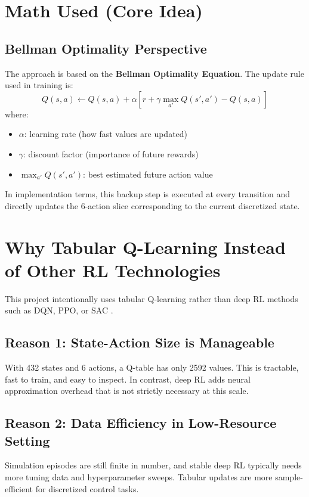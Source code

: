 \documentclass[conference]{IEEEtran}
\begin{document}
\section{Math Used (Core Idea)}
\subsection{Bellman Optimality Perspective}
The approach is based on the \textbf{Bellman Optimality Equation}. The update rule used in training is:
\begin{equation}
Q(s,a) \leftarrow Q(s,a) + \alpha \left[r + \gamma \max_{a'}Q(s',a') - Q(s,a)\right]
\end{equation}
where:
\begin{itemize}
    \item \(\alpha\): learning rate (how fast values are updated)
    \item \(\gamma\): discount factor (importance of future rewards)
    \item \(\max_{a'}Q(s',a')\): best estimated future action value
\end{itemize}
In implementation terms, this backup step is executed at every transition and directly updates the 6-action slice corresponding to the current discretized state.

\section{Why Tabular Q-Learning Instead of Other RL Technologies}
This project intentionally uses tabular Q-learning rather than deep RL methods such as DQN, PPO, or SAC \cite{dqn_nature,ppo,sac}.

\subsection{Reason 1: State-Action Size is Manageable}
With 432 states and 6 actions, a Q-table has only 2592 values. This is tractable, fast to train, and easy to inspect. In contrast, deep RL adds neural approximation overhead that is not strictly necessary at this scale.

\subsection{Reason 2: Data Efficiency in Low-Resource Setting}
Simulation episodes are still finite in number, and stable deep RL typically needs more tuning data and hyperparameter sweeps. Tabular updates are more sample-efficient for discretized control tasks.
\end{document}

